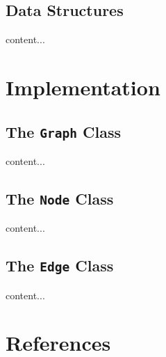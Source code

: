 \documentclass[xcolor={usenames,dvipsnames,svgnames}]{beamer}
\begin{document}
\subsection{Data Structures}
\begin{frame}
content...
\end{frame}

\section{Implementation}
\subsection{The {\tt Graph} Class}
\begin{frame}
content...
\end{frame}
\subsection{The {\tt Node} Class}
\begin{frame}
content...
\end{frame}
\subsection{The {\tt Edge} Class}
\begin{frame}
content...
\end{frame}


\section{References}
\begin{frame}[allowframebreaks]
\nocite{*}
\printbibliography
\end{frame}
\end{document}
